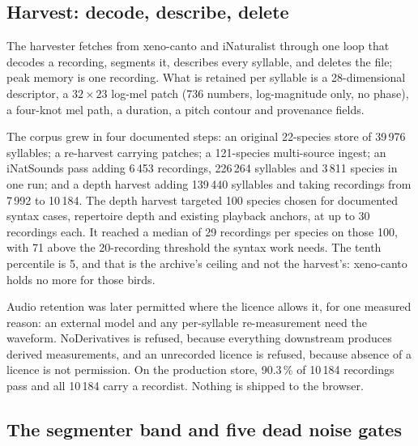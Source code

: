 \documentclass[10pt,twocolumn,a4paper]{article}
\begin{document}
\subsection{Harvest: decode, describe, delete}

The harvester fetches from xeno-canto \citep{xenocanto} and iNaturalist
\citep{inatsounds2024} through one loop that decodes a
recording, segments it, describes every syllable, and deletes the file; peak memory is one
recording. What is retained per syllable is a 28-dimensional descriptor, a
$32 \times 23$ log-mel patch (736 numbers, log-magnitude only, no phase), a four-knot
mel path, a duration, a pitch contour and provenance fields.

The corpus grew in four documented steps: an original 22-species store of 39\,976
syllables; a re-harvest carrying patches; a 121-species multi-source ingest; an
iNatSounds pass adding 6\,453 recordings, 226\,264 syllables and 3\,811 species in one run;
and a depth harvest adding 139\,440 syllables and taking recordings from 7\,992 to 10\,184.
The depth harvest targeted 100 species chosen for documented syntax cases, repertoire depth
and existing playback anchors, at up to 30 recordings each. It reached a median of 29
recordings per species on those 100, with 71 above the 20-recording threshold the syntax
work needs. The tenth percentile is 5, and that is the archive's ceiling and not the
harvest's: xeno-canto holds no more for those birds.

Audio retention was later permitted where the licence allows it, for one measured reason:
an external model and any per-syllable re-measurement need the waveform. NoDerivatives is
refused, because everything downstream produces derived measurements, and an unrecorded
licence is refused, because absence of a licence is not permission. On the production store,
90.3\,\% of 10\,184 recordings pass and all 10\,184 carry a recordist. Nothing is shipped to
the browser.

\subsection{The segmenter band and five dead noise gates}
\label{sec:noisegates}
\end{document}
